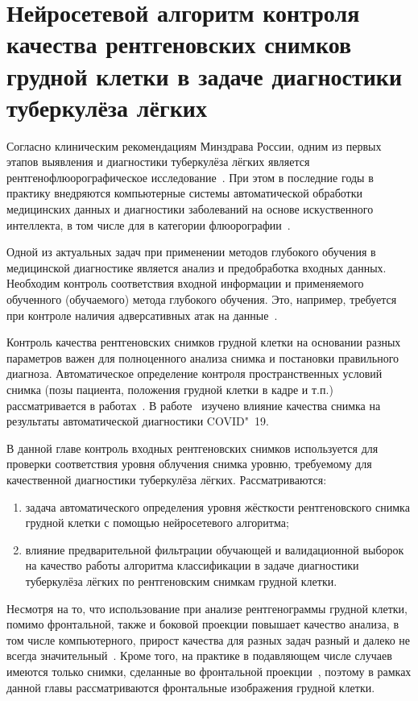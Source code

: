 \chapter{Нейросетевой алгоритм контроля качества рентгеновских снимков грудной клетки в задаче диагностики туберкулёза лёгких}\label{ch:ch3}

Согласно клиническим рекомендациям Минздрава России, одним из первых этапов выявления и диагностики туберкулёза лёгких является рентгенофлюорографическое исследование~\cite{васильева2022туберкулез}. При этом в последние годы в практику внедряются компьютерные системы автоматической обработки медицинских данных и диагностики заболеваний на основе искуственного интеллекта, в том числе для в категории флюорографии~\cite{СМ106054, рг2023, рбк2023, интерфакс2023}.

Одной из актуальных задач при применении методов глубокого обучения в медицинской диагностике является анализ и предобработка входных данных. Необходим контроль соответствия входной информации и применяемого обученного (обучаемого) метода глубокого обучения. Это, например, требуется при контроле наличия адверсативных атак на данные~\cite{finlayson2019adversarial}.

Контроль качества рентгеновских снимков грудной клетки на основании разных параметров важен для полноценного анализа снимка и постановки правильного диагноза. Автоматическое определение контроля пространственных условий снимка (позы пациента, положения грудной клетки в кадре и т.п.) рассматривается в работах~\cite{nousiainen2021automating, von2020robust, jia2019application}. В работе~\cite{sadre2021validating} изучено влияние качества снимка на результаты автоматической диагностики COVID"~19.

В данной главе контроль входных рентгеновских снимков используется для проверки соответствия уровня облучения снимка уровню, требуемому для качественной диагностики туберкулёза лёгких. Рассматриваются:
\begin{enumerate}[beginpenalty=10000]
	\item задача автоматического определения уровня жёсткости рентгеновского снимка грудной клетки с помощью нейросетевого алгоритма;
	\item влияние предварительной фильтрации обучающей и валидационной выборок на качество работы алгоритма классификации в задаче диагностики туберкулёза лёгких по рентгеновским снимкам грудной клетки.
\end{enumerate}

Несмотря на то, что использование при анализе рентгенограммы грудной клетки, помимо фронтальной, также и боковой проекции повышает качество анализа, в том числе компьютерного, прирост качества для разных задач разный и далеко не всегда значительный~\cite{kluthke2016additional, hashir2020quantifying}. Кроме того, на практике в подавляющем числе случаев имеются только снимки, сделанные во фронтальной проекции~\cite{вишнякова2016частота}, поэтому в рамках данной главы рассматриваются фронтальные изображения грудной клетки.

